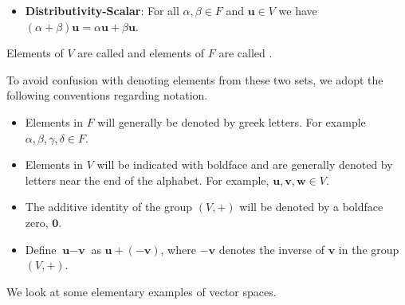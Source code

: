\begin{definition}
\begin{itemize}
        \item \textbf{Distributivity-Scalar}: For all $\alpha, \beta \in F$ and $\textbf{u} \in V$ we have $(\alpha+\beta)\textbf{u} = \alpha\textbf{u} + \beta\textbf{u}$.
    \end{itemize}
    Elements of $V$ are called  and elements of $F$ are called .
\end{definition}

To avoid confusion with denoting elements from these two sets, we adopt the following conventions regarding notation.
\begin{itemize}
    \item Elements in $F$ will generally be denoted by greek letters. For example $\alpha, \beta, \gamma, \delta \in F$.
    \item Elements in $V$ will be indicated with boldface and are generally denoted by letters near the end of the alphabet. For example, $\textbf{u}, \textbf{v}, \textbf{w} \in V$.
    \item The additive identity of the group $(V, +)$ will be denoted by a boldface zero, $\textbf{0}$.
    \item Define $\textbf{u} - \textbf{v}$ as $\textbf{u} + (-\textbf{v})$, where $-\textbf{v}$ denotes the inverse of $\textbf{v}$ in the group $(V, +)$.
\end{itemize}

We look at some elementary examples of vector spaces.

